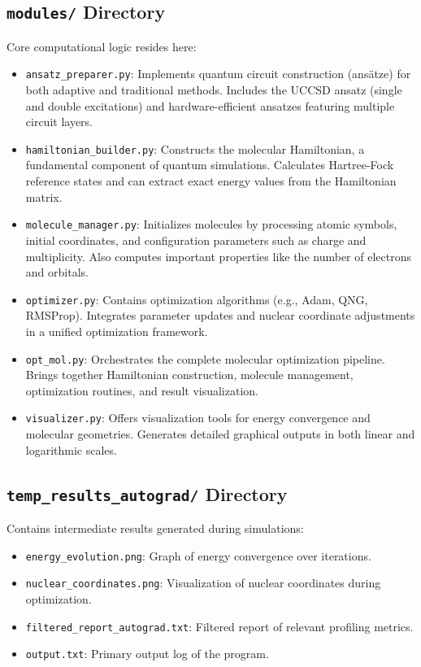\subsection{\texttt{modules/} Directory}
Core computational logic resides here:
\begin{itemize}
    \item \texttt{ansatz\_preparer.py}:
    Implements quantum circuit construction (ansätze) for both adaptive and traditional methods. Includes the UCCSD ansatz (single and double excitations) and hardware-efficient ansatzes featuring multiple circuit layers.
    \item \texttt{hamiltonian\_builder.py}:
    Constructs the molecular Hamiltonian, a fundamental component of quantum simulations. Calculates Hartree-Fock reference states and can extract exact energy values from the Hamiltonian matrix.
    \item \texttt{molecule\_manager.py}:
    Initializes molecules by processing atomic symbols, initial coordinates, and configuration parameters such as charge and multiplicity. Also computes important properties like the number of electrons and orbitals.
    \item \texttt{optimizer.py}:
    Contains optimization algorithms (e.g., Adam, QNG, RMSProp). Integrates parameter updates and nuclear coordinate adjustments in a unified optimization framework.
    \item \texttt{opt\_mol.py}:
    Orchestrates the complete molecular optimization pipeline. Brings together Hamiltonian construction, molecule management, optimization routines, and result visualization.
    \item \texttt{visualizer.py}:
    Offers visualization tools for energy convergence and molecular geometries. Generates detailed graphical outputs in both linear and logarithmic scales.
\end{itemize}

\subsection{\texttt{temp\_results\_autograd/} Directory}
Contains intermediate results generated during simulations:
\begin{itemize}
    \item \texttt{energy\_evolution.png}: Graph of energy convergence over iterations.
    \item \texttt{nuclear\_coordinates.png}: Visualization of nuclear coordinates during optimization.
    \item \texttt{filtered\_report\_autograd.txt}: Filtered report of relevant profiling metrics.
    \item \texttt{output.txt}: Primary output log of the program.
\end{itemize}

